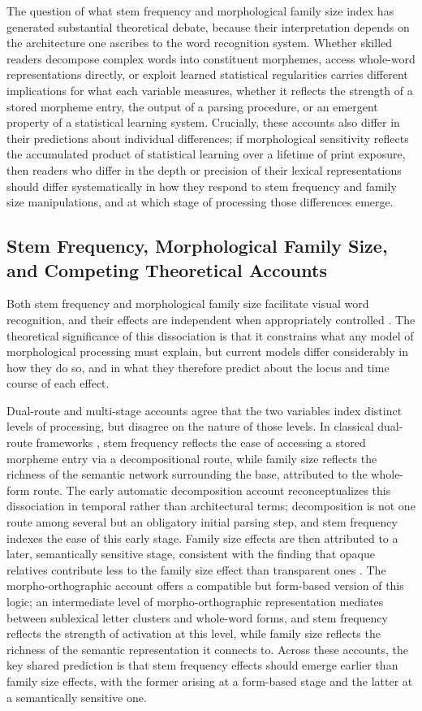 \documentclass[utf8]{FrontiersinHarvard} %
\begin{document}
The question of what stem frequency and morphological family size index has generated substantial theoretical debate, because their interpretation depends on the architecture one ascribes to the word recognition system. Whether skilled readers decompose complex words into constituent morphemes, access whole-word representations directly, or exploit learned statistical regularities carries different implications for what each variable measures, whether it reflects the strength of a stored morpheme entry, the output of a parsing procedure, or an emergent property of a statistical learning system. Crucially, these accounts also differ in their predictions about individual differences; if morphological sensitivity reflects the accumulated product of statistical learning over a lifetime of print exposure, then readers who differ in the depth or precision of their lexical representations should differ systematically in how they respond to stem frequency and family size manipulations, and at which stage of processing those differences emerge.

\subsection{Stem Frequency, Morphological Family Size, and Competing Theoretical Accounts}
Both stem frequency and morphological family size facilitate visual word recognition, and their effects are independent when appropriately controlled \citep{CITATION}. The theoretical significance of this dissociation is that it constrains what any model of morphological processing must explain, but current models differ considerably in how they do so, and in what they therefore predict about the locus and time course of each effect.

Dual-route and multi-stage accounts agree that the two variables index distinct levels of processing, but disagree on the nature of those levels. In classical dual-route frameworks \citep{CITATION}, stem frequency reflects the ease of accessing a stored morpheme entry via a decompositional route, while family size reflects the richness of the semantic network surrounding the base, attributed to the whole-form route. The early automatic decomposition account \citep{CITATION} reconceptualizes this dissociation in temporal rather than architectural terms; decomposition is not one route among several but an obligatory initial parsing step, and stem frequency indexes the ease of this early stage. Family size effects are then attributed to a later, semantically sensitive stage, consistent with the finding that opaque relatives contribute less to the family size effect than transparent ones \citep{CITATION}. The morpho-orthographic account \citep{CITATION} offers a compatible but form-based version of this logic; an intermediate level of morpho-orthographic representation mediates between sublexical letter clusters and whole-word forms, and stem frequency reflects the strength of activation at this level, while family size reflects the richness of the semantic representation it connects to. Across these accounts, the key shared prediction is that stem frequency effects should emerge earlier than family size effects, with the former arising at a form-based stage and the latter at a semantically sensitive one.
\end{document}
